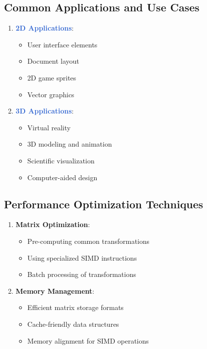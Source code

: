 \documentclass[12pt]{article}
\begin{document}
\subsection{Common Applications and Use Cases}

\begin{enumerate}
    \item \textcolor{highlight}{\textbf{2D Applications}}:
        \begin{itemize}
            \item User interface elements
            \item Document layout
            \item 2D game sprites
            \item Vector graphics
        \end{itemize}
    
    \item \textcolor{highlight}{\textbf{3D Applications}}:
        \begin{itemize}
            \item Virtual reality
            \item 3D modeling and animation
            \item Scientific visualization
            \item Computer-aided design
        \end{itemize}
\end{enumerate}

\subsection{Performance Optimization Techniques}

\begin{enumerate}
    \item \textcolor{important}{\textbf{Matrix Optimization}}:
        \begin{itemize}
            \item Pre-computing common transformations
            \item Using specialized SIMD instructions
            \item Batch processing of transformations
        \end{itemize}
    
    \item \textcolor{important}{\textbf{Memory Management}}:
        \begin{itemize}
            \item Efficient matrix storage formats
            \item Cache-friendly data structures
            \item Memory alignment for SIMD operations
        \end{itemize}
\end{enumerate}
\end{document}
